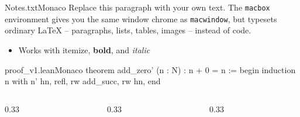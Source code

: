 \documentclass{retrobeamer}
\begin{document}
\begin{frame}[t]
  \begin{macbox}{Notes.txt}{Monaco}
    \vspace{2pt}
    \Large
    Replace this paragraph with your own text. The \texttt{macbox}
    environment gives you the same window chrome as \texttt{macwindow},
    but typesets ordinary LaTeX -- paragraphs, lists, tables, images --
    instead of code.

    \vspace{4pt}
    \begin{itemize}
      \item Works with itemize, \textbf{bold}, and \textit{italic}
    \end{itemize}
  \end{macbox}
\end{frame}

\begin{frame}[fragile,t]
\begin{macwindow}{proof\_v1.lean}{Monaco}
theorem add_zero'
  (n : N) : n + 0 = n :=
begin
  induction n with n' hn,
    refl,
    rw add_succ,
    rw hn,
end
\end{macwindow}
\end{frame}

\begin{frame}[t]
  \vspace{1.2cm}
  \begin{columns}[T]
    \begin{column}{0.33\textwidth}
    \end{column}
    \begin{column}{0.33\textwidth}
    \end{column}
    \begin{column}{0.33\textwidth}
    \end{column}
  \end{columns}
\end{frame}
\end{document}

